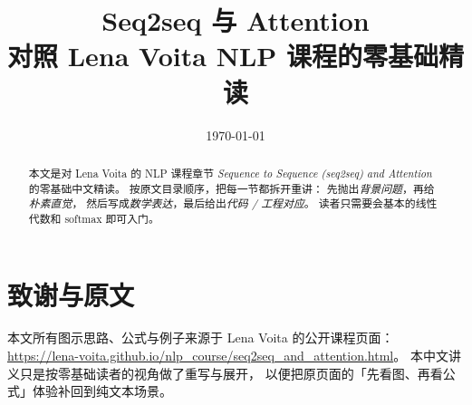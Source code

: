 \documentclass[11pt,a4paper]{ctexart}
\title{Seq2seq 与 Attention\\\large 对照 Lena Voita NLP 课程的零基础精读}
\author{}
\date{\today}
\begin{document}
\maketitle

\begin{abstract}
本文是对 Lena Voita 的 NLP 课程章节
\textit{Sequence to Sequence (seq2seq) and Attention} 的零基础中文精读。
按原文目录顺序，把每一节都拆开重讲：
先抛出\emph{背景问题}，再给\emph{朴素直觉}，
然后写成\emph{数学表达}，最后给出\emph{代码 / 工程对应}。
读者只需要会基本的线性代数和 softmax 即可入门。
\end{abstract}

\tableofcontents
\newpage







\section*{致谢与原文}
本文所有图示思路、公式与例子来源于
Lena Voita 的公开课程页面：
\url{https://lena-voita.github.io/nlp_course/seq2seq_and_attention.html}。
本中文讲义只是按零基础读者的视角做了重写与展开，
以便把原页面的「先看图、再看公式」体验补回到纯文本场景。
\end{document}
